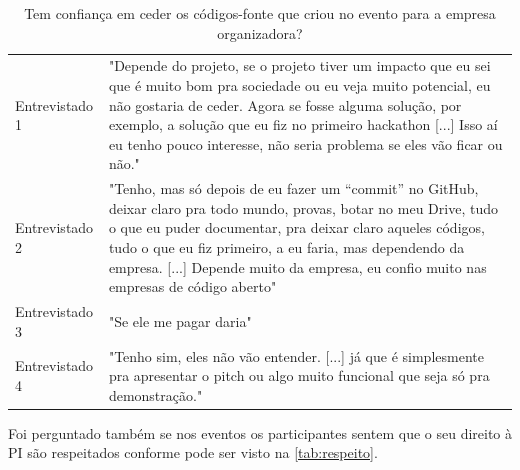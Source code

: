 \begin{table}[H]
\centering
\caption{Tem confiança em ceder os códigos-fonte que criou no evento para a empresa organizadora?}
\label{tab:confianca}
\begin{tabular}{l|p{}}
Entrevistado 1 &
  "Depende do projeto, se o projeto tiver um impacto que eu sei que é muito bom pra sociedade ou eu veja muito potencial, eu não gostaria de ceder. Agora se fosse alguma solução, por exemplo, a solução que eu fiz no primeiro hackathon {[}...{]} Isso aí eu tenho pouco interesse, não seria problema se eles vão ficar ou não." \\
Entrevistado 2 &
  "Tenho, mas só depois de eu fazer um “commit” no GitHub, deixar claro pra todo mundo, provas, botar no meu Drive, tudo o que eu puder documentar, pra deixar claro aqueles códigos, tudo o que eu fiz primeiro, a eu faria, mas dependendo da empresa. {[}...{]} Depende muito da empresa, eu confio muito nas empresas de código aberto" \\
Entrevistado 3 & "Se ele me pagar daria"                                                                                                                          \\
Entrevistado 4 & "Tenho sim, eles não vão entender. {[}...{]} já que é simplesmente pra apresentar o pitch ou algo muito funcional que seja só pra demonstração."
\end{tabular}
\end{table}





Foi perguntado também se nos eventos os participantes sentem que o seu direito à PI são respeitados conforme pode ser visto na \autoref{tab:respeito}.


